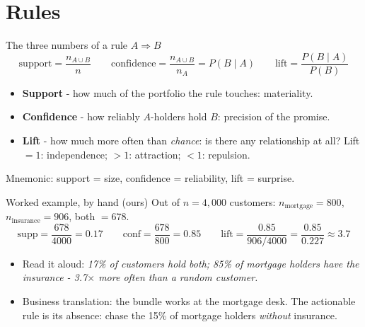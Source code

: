 \documentclass[10pt,aspectratio=169]{beamer}
\begin{document}
\section{Rules}

\begin{frame}{The three numbers of a rule $A \Rightarrow B$}
  \[
    \text{support} = \frac{n_{A \cup B}}{n}
    \qquad
    \text{confidence} = \frac{n_{A \cup B}}{n_A} = P(B \mid A)
    \qquad
    \text{lift} = \frac{P(B \mid A)}{P(B)}
  \]
  \vspace{0.3em}
  \begin{itemize}
    \item \textbf{Support} - how much of the portfolio the rule touches:
          \alert{materiality}.
    \item \textbf{Confidence} - how reliably $A$-holders hold $B$:
          \alert{precision of the promise}.
    \item \textbf{Lift} - how much more often than \emph{chance}:
          \alert{is there any relationship at all?}
          Lift $= 1$: independence; $> 1$: attraction; $< 1$: repulsion.
  \end{itemize}
  \vspace{0.4em}
  \begin{center}\small
    Mnemonic: support = size, confidence = reliability, lift = surprise.
  \end{center}
\end{frame}

\begin{frame}{Worked example, by hand (ours)}
  Out of $n = 4{,}000$ customers: $n_{\text{mortgage}} = 800$,
  $n_{\text{insurance}} = 906$, both $= 678$.
  \[
    \text{supp} = \frac{678}{4000} = 0.17
    \qquad
    \text{conf} = \frac{678}{800} = 0.85
    \qquad
    \text{lift} = \frac{0.85}{906/4000} = \frac{0.85}{0.227} \approx 3.7
  \]
  \begin{itemize}\small
    \item Read it aloud: \emph{17\% of customers hold both; 85\% of
          mortgage holders have the insurance - 3.7$\times$ more often
          than a random customer.}
    \item Business translation: the bundle works at the mortgage desk.
          The actionable rule is its \alert{absence}: chase the 15\% of
          mortgage holders \emph{without} insurance.
  \end{itemize}
\end{frame}
\end{document}
